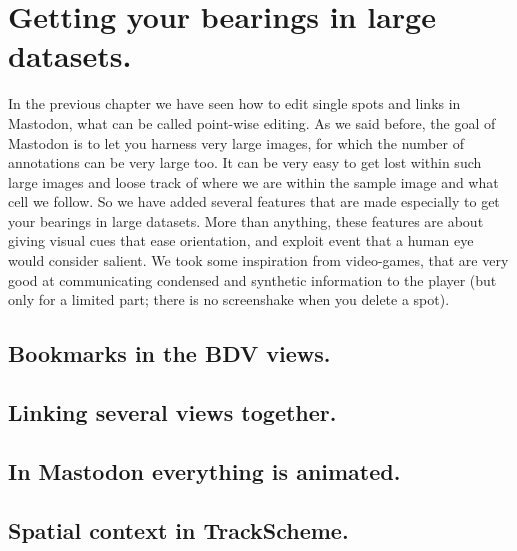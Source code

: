 \section{Getting your bearings in large datasets.}

In the previous chapter we have seen how to edit single spots and links in Mastodon, what can be called point-wise editing.
As we said before, the goal of Mastodon is to let you harness very large images, for which the number of annotations can be very large too.
It can be very easy to get lost within such large images and loose track of where we are within the sample image and what cell we follow. 
So we have added several features that are made especially to get your bearings in large datasets.
More than anything, these features are about giving visual cues that ease orientation, and exploit event that a human eye would consider salient. 
We took some inspiration from video-games, that are very good at communicating condensed and synthetic information to the player
(but only for a limited part; there is no screenshake when you delete a spot).



\subsection{Bookmarks in the BDV views.}

\subsection{Linking several views together.}

\subsection{In Mastodon everything is animated.}

\subsection{Spatial context in TrackScheme.}